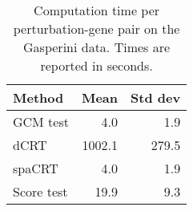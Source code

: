 \begin{table}[!h]
\centering
\caption{\label{tab:time_comparison}Computation time per perturbation-gene pair on the Gasperini data. Times are reported in seconds.}
\centering
\begin{tabular}[t]{lrr}
\toprule
Method & Mean & Std dev\\
\midrule
GCM test & 4.0 & 1.9\\
dCRT & 1002.1 & 279.5\\
spaCRT & 4.0 & 1.9\\
Score test & 19.9 & 9.3\\
\bottomrule
\end{tabular}
\end{table}
